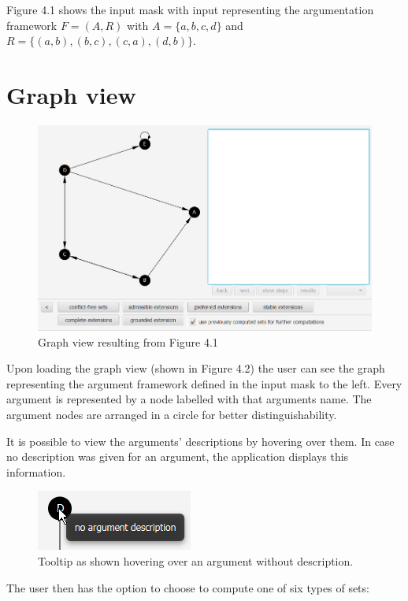 \documentclass[draft,final]{vutinfth} %
\newcommand{\hl}{\par\vspace{6pt}} %
\begin{document}
Figure 4.1 shows the input mask with input representing the argumentation framework $F=(A,R)$ with $A=\{a,b,c,d\}$ and $R=\{(a,b),(b,c),(c,a),(d,b)\}$.\hl

\section{Graph view}

\FloatBarrier
	\begin{figure}[!h]
		\centering
		\includegraphics[width=\linewidth]{pics/graph.png}
		\caption{Graph view resulting from Figure 4.1}
	\end{figure}
\FloatBarrier

Upon loading the graph view (shown in Figure 4.2) the user can see the graph representing the argument framework defined in the input mask to the left. Every argument is represented by a node labelled with that arguments name. The argument nodes are arranged in a circle for better distinguishability.\hl
It is possible to view the arguments' descriptions by hovering over them. In case no description was given for an argument, the application displays this information.\hl

\FloatBarrier
	\begin{figure}[!h]
		\centering
		\includegraphics[scale=2]{pics/argdes.png}
		\caption{Tooltip as shown hovering over an argument without description.}
	\end{figure}
\FloatBarrier

The user then has the option to choose to compute one of six types of sets:
\end{document}
